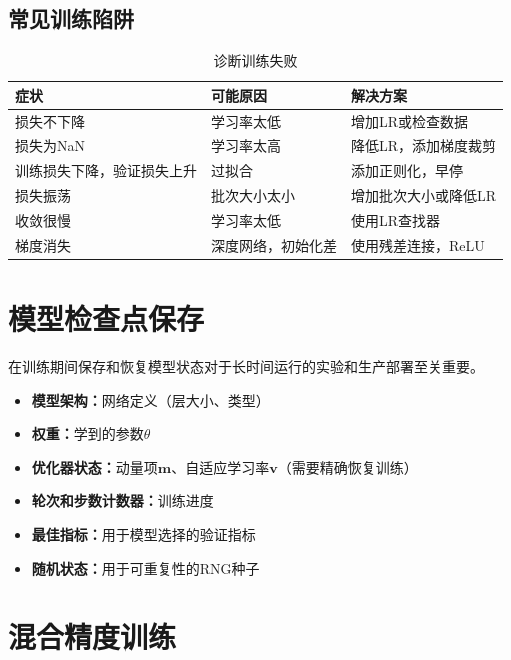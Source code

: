 \subsection{常见训练陷阱}

\begin{table}[ht]
    \centering
    \caption{诊断训练失败}
    \begin{tabular}{L{4cm} L{5cm} L{4.5cm}}
        \toprule
        \textbf{症状} & \textbf{可能原因} & \textbf{解决方案} \\
        \midrule
        损失不下降 & 学习率太低 & 增加LR或检查数据 \\
        损失为NaN & 学习率太高 & 降低LR，添加梯度裁剪 \\
        训练损失下降，验证损失上升 & 过拟合 & 添加正则化，早停 \\
        损失振荡 & 批次大小太小 & 增加批次大小或降低LR \\
        收敛很慢 & 学习率太低 & 使用LR查找器 \\
        梯度消失 & 深度网络，初始化差 & 使用残差连接，ReLU \\
        \bottomrule
    \end{tabular}
\end{table}

\section{模型检查点保存}

在训练期间保存和恢复模型状态对于长时间运行的实验和生产部署至关重要。

\begin{itemize}
    \item \textbf{模型架构：}网络定义（层大小、类型）
    \item \textbf{权重：}学到的参数$\theta$
    \item \textbf{优化器状态：}动量项$\mathbf{m}$、自适应学习率$\mathbf{v}$（需要精确恢复训练）
    \item \textbf{轮次和步数计数器：}训练进度
    \item \textbf{最佳指标：}用于模型选择的验证指标
    \item \textbf{随机状态：}用于可重复性的RNG种子
\end{itemize}

\section{混合精度训练}

